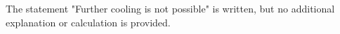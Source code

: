 The statement "Further cooling is not possible" is written, but no additional explanation or calculation is provided.